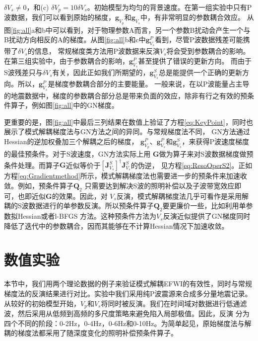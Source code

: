 $\delta V_s \neq 0$，和(c) $\delta V_p =10\delta
V_s$。初始模型为均匀的背景速度。在第一组实验中只有P波数据，我们可以看到原始的梯度，$\mathbf{g}_{V_p}$和$\mathbf{g}_{V_s}$中，有非常明显的参数耦合效应。
从图\ref{fig:all}a和b中可以看到，对于物理参数A而言，另一个参数B扰动会产生一个与B扰动方向相反的A的梯度。从图\ref{fig:all}b和c中$\mathbf{g}^{P}_{V_s}$看到，尽管P波数据残差可能携带了$\delta V_s$的信息，
常规梯度类方法用P波数据来反演$V_s$将会受到参数耦合的影响。在第三组实验中，由于参数耦合的影响，$\mathbf{g}^P_{V_s}$甚至提供了错误的更新方向。
而由于S波残差只与$\delta
V_s$有关，因此正如我们所期望的，$\mathbf{g}^S_{V_s}$总是能提供一个正确的更新方向。所以，$\mathbf{g}^P_{V_s}$是梯度参数耦合部分的主要能量。
一般来说，在以P波能量占主导的地震数据中，梯度的参数耦合部分总是带来负面的效应，除非有行之有效的预条件算子，例如图\ref{fig:all}中的GN梯度。

更重要的是，图\ref{fig:all}中最后三列结果在数值上验证了方程\eqref{eq:KeyPoint}，同时也展示了模式解耦梯度法与GN方法之间的异同。与常规梯度法不同，
GN方法通过Hessian的逆加权叠加三个解耦之后的梯度，
$\mathbf{g}^P_{V_p}$、$\mathbf{g}^P_{V_s}$和$\mathbf{g}^S_{V_s}$，来获得P波速度梯度的最佳预条件。对于S波速度，GN方法实际上用
$\mathbf{G}$做为算子来对S波数据梯度做预条件处理。而算子$\mathbf{G}$近似等价于$[\mathbf{J}^{S}_{V_s}]^{\dagger}\mathbf{J}^{S}_{V_s}$的伪逆，
见方程\ref{eq:ResoOperS2}。正如方程\eqref{eq:Gradientmethod}所示，模式解耦梯度法也需要进一步的预条件来加速收敛。例如，预条件算子$\mathbf{Q}_2$
只需要达到解决S波的照明补偿以及子波带宽效应即可，也即近似$\mathbf{G}$的效果。因此，对
$V_s$反演，模式解耦梯度法几乎可看作是采用解耦的S波数据进行的单参数反演。所以预条件算子$\mathbf{Q}_2$要更廉价一些，比如利用单参数拟Hessian或者l-BFGS
方法。这种预条件方法为$V_s$反演近似提供了GN梯度同时降低了迭代中的参数耦合，因而其能够在不计算Hessian情况下加速收敛。

\section{数值实验}
本节中，我们用两个理论数据的例子来验证模式解耦EFWI的有效性，同时与常规梯度法的反演结果进行对比。实验中我们采用纯P波震源来合成多分量地震记录。
从较好的初始模型开始，$V_p$和$V_s$将同时被反演。我们在时间域对数据进行低通滤波，然后采用从低频到高频的多尺度策略来避免陷入局部极值。因此，反演
分为四个不同的阶段：0-2Hz，0-4Hz，0-6Hz和0-10Hz。为简单起见，原始梯度法与解耦的梯度法都采用了随深度变化的照明补偿预条件算子\cite[]{kohn:2012}。
